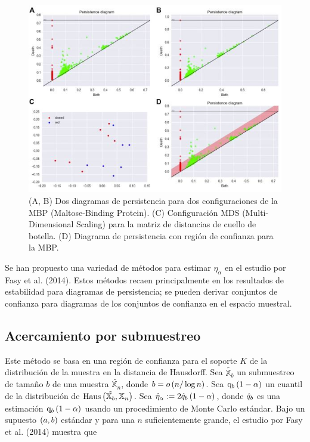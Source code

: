\begin{figure}[ht]
    \centering
    \includegraphics[width=0.85\linewidth]{./figures/Figura14.JPG}
    \caption{
        (A, B) Dos diagramas de persistencia para dos configuraciones de la MBP
        (Maltose-Binding Protein).
        (C) Configuraci\'on MDS (Multi-Dimensional Scaling)
        para la matriz de distancias de cuello de botella.
        (D) Diagrama de persistencia con regi\'on de confianza para la MBP.
    }
    \label{fig:Figura 14}
    \vspace{15pt}
\end{figure}

Se han propuesto una variedad de m\'etodos para estimar $\eta_{\alpha}$
en el estudio por Fasy et al. (2014)\cite{Fasy2014b}.
Estos m\'etodos recaen principalmente en los resultados de estabilidad
para diagramas de persistencia;
se pueden derivar conjuntos de confianza para diagramas
de los conjuntos de confianza en el espacio muestral.

\subsection*{Acercamiento por submuestreo}

Este m\'etodo se basa en una regi\'on de confianza para el soporte $K$
de la distribuci\'on de la muestra en la distancia de Hausdorff.
Sea $\tilde{\mathbb{X}_{b}}$ un submuestreo de tama\~{n}o $b$ de una muestra
$\tilde{\mathbb{X}_{n}}$, donde $b = o\left(n/\log n\right)$.
Sea $\mathrm{q}_{b}\left(1 - \alpha\right)$ un cuantil de la distribuci\'on de
$\mathrm{Haus}\left(\tilde{\mathbb{X}_{b}},\mathbb{X}_{n}\right)$.
Sea $\Hat{\eta}_{\alpha}:=2\Hat{q}_{b}\left(1-\alpha\right)$, donde
$\Hat{q}_{b}$ es una estimaci\'on $\mathrm{q}_{b}\left(1-\alpha\right)$ usando un
procedimiento de Monte Carlo est\'andar.
Bajo un supuesto $\left(a,b\right)$ est\'andar y para una $n$ suficientemente grande,
el estudio por Fasy et al. (2014)\cite{Fasy2014b} muestra que

